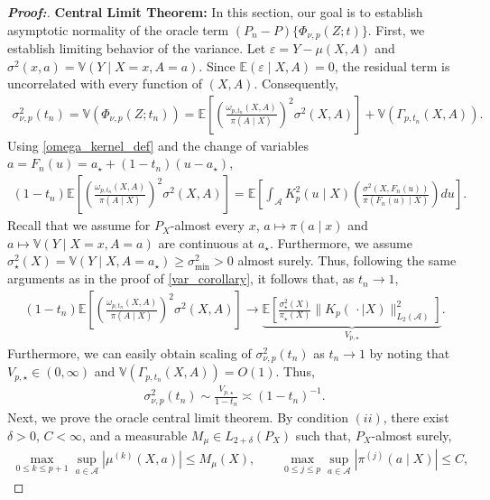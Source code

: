 \documentclass[11pt,twoside]{article}
\theoremstyle{definition}
\theoremstyle{remark}
\begin{document}
\begin{proof}[\textbf{Proof:}]
\textbf{Central Limit Theorem:} In this section, our goal is to establish asymptotic normality of the oracle term $(P_n - P) \{\Phi_{\nu, p}(Z; t)\}$. First, we establish limiting behavior of the variance. Let $\varepsilon = Y-\mu(X,A)$ and $\sigma^2(x,a)=\mathbb{V}(Y\mid X=x,A=a)$. Since $\mathbb{E}(\varepsilon \mid X,A)=0$, the residual term is uncorrelated with every function of $(X,A)$. Consequently,
\begin{align*}
    \sigma_{\nu,p}^2(t_n) = \mathbb{V}(\Phi_{\nu, p}(Z; t_n)) = \mathbb{E} \! \left[ \left(\frac{\omega_{p,t_n}(X,A)}{\pi(A\mid X)} \right)^2\sigma^2(X,A) \right] + \mathbb{V}\!\left(\Gamma_{p,t_n}(X,A)\right).
\end{align*}
Using \cref{omega_kernel_def} and the change of variables $a=F_n(u)=a_\star+(1 - t_n)(u-a_\star)$,
\begin{align*}
    (1 - t_n) \mathbb{E}\!\left[\left(\frac{\omega_{p,t_n}(X,A)}{\pi(A\mid X)} \right)^2\sigma^2(X,A) \right] = \mathbb{E}\!\left[ \int_{\mathcal{A}} K^2_p(u\mid X) \left(\frac{\sigma^2(X,F_n(u))}{\pi(F_n(u)\mid X)} \right) du \right].
\end{align*}
Recall that we assume for $P_X$-almost every $x$, $a\mapsto\pi(a\mid x)$ and $a\mapsto \mathbb{V}(Y\mid X=x,A=a)$ are continuous at $a_\star$. Furthermore, we assume $\sigma_\star^2(X)=\mathbb{V}(Y\mid X,A=a_\star)\geq\sigma_{\min}^2>0$ almost surely. Thus, following the same arguments as in the proof of \cref{var_corollary}, it follows that, as $t_n \to 1$,
\begin{align*}
    (1 - t_n) \mathbb{E}\!\left[\left(\frac{\omega_{p,t_n}(X,A)}{\pi(A\mid X)} \right)^2\sigma^2(X,A) \right] \longrightarrow \underbrace{\mathbb{E} \! \left[ \frac{\sigma_\star^2(X)}{\pi_\star(X)} \| K_p(\, \cdot \mid X) \|^2_{L_2(\mathcal{A})} \right]}_{ V_{p,\star}}.
\end{align*}
Furthermore, we can easily obtain scaling of $\sigma_{\nu,p}^2(t_n)$ as $t_n \to 1$ by noting that $V_{p,\star} \in (0, \infty)$ and $ \mathbb{V}\!\left(\Gamma_{p,t_n}(X,A)\right) = O(1)$. Thus,
\begin{align*}
    \sigma_{\nu,p}^2(t_n) \sim \frac{V_{p,\star}}{1 - t_n} \asymp (1 - t_n)^{-1}.
\end{align*}
Next, we prove the oracle central limit theorem. By condition $(ii)$, there exist $\delta>0$, $C<\infty$, and a measurable
$M_\mu\in L_{2+\delta}(P_X)$ such that, $P_X$-almost surely,
\begin{align*}
    \max_{0\leq k\leq p+1} \sup_{a\in\mathcal{A}}|\mu^{(k)}(X,a)| \leq M_\mu(X), \qquad \max_{0\leq j\leq p} \sup_{a\in\mathcal{A}}|\pi^{(j)}(a\mid X)| \leq C,

\end{align*}
\end{proof}
\end{document}
